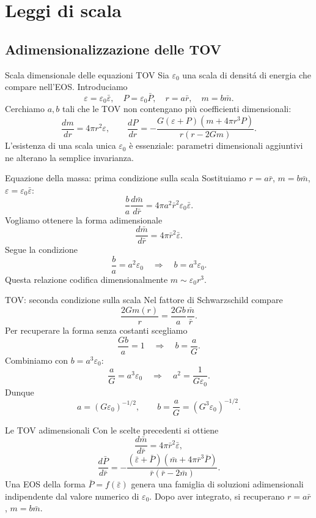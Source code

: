 \section{Leggi di scala}

\subsection{Adimensionalizzazione delle TOV}

\begin{frame}[t]{Scala dimensionale delle equazioni TOV}
\small
Sia $\varepsilon_0$ una scala di densit\'a di energia che compare nell'EOS. Introduciamo
\[
\varepsilon=\varepsilon_0\bar\varepsilon,\quad P=\varepsilon_0\bar P,
\quad r=a\bar r,\quad m=b\bar m.
\]
Cerchiamo $a,b$ tali che le TOV non contengano più coefficienti dimensionali:
\[
\frac{dm}{dr}=4\pi r^2\varepsilon,
\qquad
\frac{dP}{dr}=-\frac{G(\varepsilon+P)(m+4\pi r^3P)}{r(r-2Gm)}.
\]
L'esistenza di una scala unica $\varepsilon_0$ è essenziale: parametri dimensionali aggiuntivi ne alterano la semplice invarianza.
\end{frame}

\begin{frame}[t]{Equazione della massa: prima condizione sulla scala}
\small
Sostituiamo $r=a\bar r$, $m=b\bar m$, $\varepsilon=\varepsilon_0\bar\varepsilon$:
\[
\frac{b}{a}\frac{d\bar m}{d\bar r}
=4\pi a^2\bar r^2\varepsilon_0\bar\varepsilon.
\]
Vogliamo ottenere la forma adimensionale
\[
\frac{d\bar m}{d\bar r}=4\pi\bar r^2\bar\varepsilon.
\]
Segue la condizione
\[
\frac ba=a^2\varepsilon_0
\quad\Longrightarrow\quad b=a^3\varepsilon_0.
\]
Questa relazione codifica dimensionalmente $m\sim\varepsilon_0r^3$.
\end{frame}

\begin{frame}[t]{TOV: seconda condizione sulla scala}
\small
Nel fattore di Schwarzschild compare
\[
\frac{2Gm(r)}r=\frac{2Gb}a\frac{\bar m}{\bar r}.
\]
Per recuperare la forma senza costanti scegliamo
\[
\frac{Gb}{a}=1\quad\Longrightarrow\quad b=\frac aG.
\]
Combiniamo con $b=a^3\varepsilon_0$:
\[
\frac aG=a^3\varepsilon_0
\quad\Longrightarrow\quad a^2=\frac1{G\varepsilon_0}.
\]
Dunque
\[
a=(G\varepsilon_0)^{-1/2},\qquad
b=\frac{a}{G}=(G^3\varepsilon_0)^{-1/2}.
\]
\end{frame}

\begin{frame}[t]{Le TOV adimensionali}
\small
Con le scelte precedenti si ottiene
\[
\frac{d\bar m}{d\bar r}=4\pi\bar r^2\bar\varepsilon,
\]
\[
\frac{d\bar P}{d\bar r}=
-\frac{(\bar\varepsilon+\bar P)
(\bar m+4\pi\bar r^3\bar P)}
{\bar r(\bar r-2\bar m)}.
\]
Una EOS della forma $\bar P=f(\bar\varepsilon)$ genera una famiglia di soluzioni adimensionali indipendente dal valore numerico di $\varepsilon_0$.
\medskip
Dopo aver integrato, si recuperano $r=a\bar r$, $m=b\bar m$.
\end{frame}

